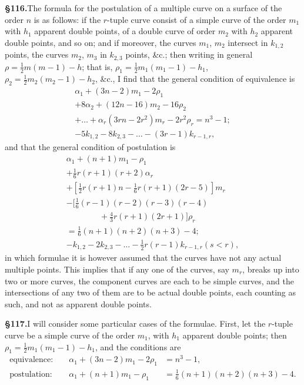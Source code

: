 \documentclass[11pt,a4paper]{article}
\begin{document}
\textbf{\S 116.}\quad The formula for the postulation of a multiple curve on a surface of the order $n$ is as follows: if the $r$-tuple curve consist of a simple curve of the order $m_1$ with $h_1$ apparent double points, of a double curve of order $m_2$ with $h_2$ apparent double points, and so on; and if moreover, the curves $m_1$, $m_2$ intersect in $k_{1,2}$ points, the curves $m_2$, $m_3$ in $k_{2,3}$ points, \&c.; then writing in general $\rho = \frac{1}{2}m(m - 1) - h$; that is, $\rho_1 = \frac{1}{2}m_1(m_1 - 1) - h_1$, $\rho_2 = \frac{1}{2}m_2(m_2 - 1) - h_2$, \&c., I find that the general condition of equivalence is
\begin{multline*}
\alpha_1 + (3n - 2)m_1 - 2\rho_1 \\
+ 8\alpha_2 + (12n - 16)m_2 - 16\rho_2 \\
+ \ldots + \alpha_r(3rn - 2r^2)m_r - 2r^2\rho_r = n^3 - 1;\\
- 5k_{1,2} - 8k_{2,3} - \ldots - (3r - 1)k_{r-1,r},
\end{multline*}
and that the general condition of postulation is
\begin{multline*}
\alpha_1 + (n + 1)m_1 - \rho_1 \\
+ \tfrac{1}{6}r(r + 1)(r + 2)\alpha_r \\
+ [\tfrac{1}{2}r(r + 1)n - \tfrac{1}{6}r(r + 1)(2r - 5)]m_r \\
- [\tfrac{1}{6}(r - 1)(r - 2)(r - 3)(r - 4) \\
\qquad\qquad + \tfrac{4}{3}r(r + 1)(2r + 1)]\rho_r \\
= \tfrac{1}{6}(n + 1)(n + 2)(n + 3) - 4;\\
- k_{1,2} - 2k_{2,3} - \ldots - \tfrac{1}{2}r(r - 1)k_{r-1,r}(s < r),
\end{multline*}
in which formulae it is however assumed that the curves have not any actual multiple points. This implies that if any one of the curves, say $m_r$, breaks up into two or more curves, the component curves are each to be simple curves, and the intersections of any two of them are to be actual double points, each counting as such, and not as apparent double points.

\textbf{\S 117.}\quad I will consider some particular cases of the formulae. First, let the $r$-tuple curve be a simple curve of the order $m_1$, with $h_1$ apparent double points; then $\rho_1 = \frac{1}{2}m_1(m_1 - 1) - h_1$, and the conditions are
\begin{align*}
\text{equivalence: } && \alpha_1 + (3n - 2)m_1 - 2\rho_1 &= n^3 - 1, \\
\text{postulation: } && \alpha_1 + (n + 1)m_1 - \rho_1 &= \tfrac{1}{6}(n + 1)(n + 2)(n + 3) - 4.
\end{align*}
\end{document}
